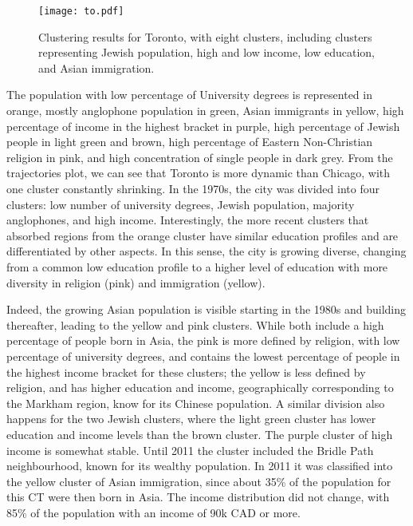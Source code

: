 \begin{figure}
    \centering 
    \texttt{[image: to.pdf]}
    \caption{Clustering results for Toronto, with eight clusters, including
    clusters representing Jewish population, high and low income, low education,
    and Asian immigration.\label{fig:to}}
\end{figure}

The population with low percentage of University degrees is represented in
orange, mostly anglophone population in green, Asian immigrants in yellow, high
percentage of income in the highest bracket in purple, high percentage of Jewish
people in light green and brown, high percentage of Eastern Non-Christian
religion in pink, and high concentration of single people in dark grey. From the
trajectories plot, we can see that Toronto is more dynamic than Chicago, with
one cluster constantly shrinking. In the 1970s, the city was divided into four
clusters: low number of university degrees, Jewish population, majority
anglophones, and high income. Interestingly, the more recent clusters that
absorbed regions from the orange cluster have similar education profiles and are
differentiated by other aspects. In this sense, the city is growing diverse,
changing from a common low education profile to a higher level of education with
more diversity in religion (pink) and immigration (yellow).


Indeed, the growing Asian population is visible starting in the 1980s and
building thereafter, leading to the yellow and pink clusters. While both include
a high percentage of people born in Asia, the pink is more defined by religion,
with low percentage of university degrees, and contains the lowest percentage of
people in the highest income bracket for these clusters; the yellow is less
defined by religion, and has higher education and income, geographically
corresponding to the Markham region, know for its Chinese population. A similar
division also happens for the two Jewish clusters, where the light green cluster
has lower education and income levels than the brown cluster. The purple cluster
of high income is somewhat stable. Until 2011 the cluster included the Bridle Path
neighbourhood, known for its wealthy population. In 2011 it was
classified into the yellow cluster of Asian immigration, since about 35\% of the
population for this CT were then born in Asia. The income distribution did not
change, with 85\% of the population with an income of 90k CAD or more.


